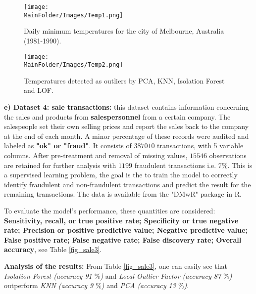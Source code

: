 \begin{figure}[H]
    \centering
    \texttt{[image: \\MainFolder/Images/Temp1.png]}
    \caption{Daily minimum temperatures for the city of Melbourne, Australia (1981-1990).}%
    \label{fig2t}
\end{figure}
\begin{figure*}[ht!]
    \centering
    \texttt{[image: \\MainFolder/Images/Temp2.png]}
    \caption{Temperatures detected as outliers by PCA, KNN, Isolation Forest and LOF.}%
    \label{fig2t1}
\end{figure*}

%
%


\noindent \textbf{e) Dataset 4: sale transactions:} this dataset contains information concerning the sales and products from \textbf{salespersonnel} from a certain company. The salespeople set their own selling prices and report the sales back to the company at the end of each month. A minor percentage of these records were audited and labeled as \textbf{"ok" or "fraud"}. It consists of $387010$ transactions, with 5 variable columns. After pre-treatment and removal of missing values, $15546$ observations are retained for further analysis with $1199$ fraudulent transactions i.e. $7 \%$. This is a supervised learning problem, the goal is the to train the model to correctly identify fraudulent and non-fraudulent transactions and predict the result for the remaining transactions. The data is available from the "DMwR" package in R.  

To evaluate the model's performance, these quantities are considered: \textbf{
Sensitivity, recall, or true positive rate; Specificity or true negative rate; Precision or positive predictive value; Negative predictive value; False positive rate; False negative rate; False discovery rate; Overall accuracy}, see Table \ref{fig_sale3}.

\noindent\textbf{Analysis of the results:} From Table \eqref{fig_sale3}, one can easily see that \textit{Isolation Forest (accuracy 91 $\%$)} and \textit{Local Outlier Factor (accuracy 87 $\%$)} outperform \textit{KNN (accuracy 9 $\%$)} and \textit{PCA (accuracy 13 $\%$)}.

